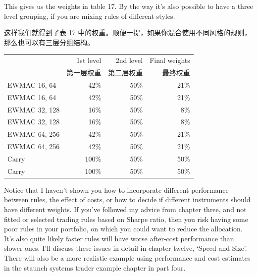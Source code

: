 \begin{englishblock} This gives us the weights in table 17. By the way it's also possible to have a three level grouping, if you are mixing rules of different styles. \end{englishblock}

\begin{chineseblock}这样我们就得到了表 17 中的权重。顺便一提，如果你混合使用不同风格的规则，那么也可以有三层分组结构。\end{chineseblock}

\begin{bilingualtableblock} \begingroup \small \centering \begin{tabular}{@{} lrrr@{}}
\toprule
& 1st level & 2nd level & Final weights \\
& 第一层权重 & 第二层权重 & 最终权重 \\
\midrule
EWMAC 16, 64 & 42\% & 50\% & 21\% \\
EWMAC 16, 64 & 42\% & 50\% & 21\% \\
EWMAC 32, 128 & 16\% & 50\% & 8\% \\
EWMAC 32, 128 & 16\% & 50\% & 8\% \\
EWMAC 64, 256 & 42\% & 50\% & 21\% \\
EWMAC 64, 256 & 42\% & 50\% & 21\% \\
Carry & 100\% & 50\% & 50\% \\
Carry & 100\% & 50\% & 50\% \\
\bottomrule
\end{tabular}
\par \endgroup \end{bilingualtableblock}

\begin{englishblock} Notice that I haven’t shown you how to incorporate different performance between rules, the effect of costs, or how to decide if different instruments should have different weights. If you’ve followed my advice from chapter three, and not fitted or selected trading rules based on Sharpe ratio, then you risk having some poor rules in your portfolio, on which you could want to reduce the allocation. It’s also quite likely faster rules will have worse after-cost performance than slower ones. I’ll discuss these issues in detail in chapter twelve, ‘Speed and Size’. There will also be a more realistic example using performance and cost estimates in the staunch systems trader example chapter in part four. \end{englishblock}

